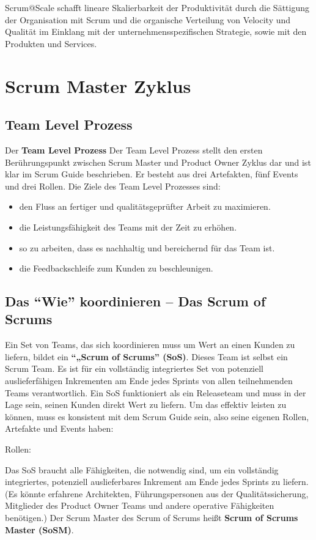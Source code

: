 \documentclass[12pt,a4paper,parskip=full]{scrartcl}
\begin{document}
Scrum@Scale schafft lineare Skalierbarkeit der Produktivität durch die
Sättigung der Organisation mit Scrum und die organische Verteilung von Velocity
und Qualität im Einklang mit der unternehmensspezifischen Strategie, sowie mit den
Produkten und Services.

\section{Scrum Master Zyklus}
\subsection{Team Level Prozess}
Der \textbf{Team Level Prozess} Der Team Level Prozess stellt den ersten Berührungspunkt
zwischen Scrum Master und Product Owner Zyklus dar und ist klar im Scrum Guide beschrieben.
Er besteht aus drei Artefakten, fünf Events und drei Rollen.
Die Ziele des Team Level Prozesses sind:
\begin{itemize}
\item den Fluss an fertiger und qualitätsgeprüfter Arbeit zu maximieren.
\item die Leistungsfähigkeit des Teams mit der Zeit zu erhöhen.
\item so zu arbeiten, dass es nachhaltig und bereichernd für das Team ist.
\item die Feedbackschleife zum Kunden zu beschleunigen.
\end{itemize}

\subsection{Das ``Wie'' koordinieren – Das Scrum of Scrums}
Ein Set von Teams, das sich koordinieren muss um Wert an einen Kunden zu liefern, bildet ein \textbf{``„Scrum of Scrums'' (SoS)}. Dieses Team ist selbst ein Scrum Team. Es ist für ein vollständig integriertes Set von potenziell auslieferfähigen Inkrementen am Ende jedes Sprints von allen teilnehmenden Teams verantwortlich. Ein SoS funktioniert als ein Releaseteam und muss in der Lage sein, seinen Kunden direkt Wert zu liefern. Um das effektiv leisten zu können, muss es konsistent mit dem Scrum Guide sein, also seine eigenen Rollen, Artefakte und Events haben:

Rollen:

Das SoS braucht alle Fähigkeiten, die notwendig sind, um ein vollständig integriertes, potenziell auslieferbares Inkrement am Ende jedes Sprints zu liefern. (Es könnte erfahrene Architekten, Führungspersonen aus der Qualitätssicherung, Mitglieder des Product Owner Teams und andere operative Fähigkeiten benötigen.) Der Scrum Master des Scrum of Scrums heißt \textbf{Scrum of Scrums Master (SoSM)}.
\end{document}

